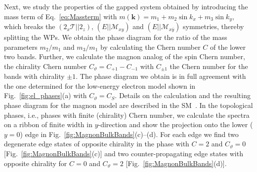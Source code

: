 \documentclass[aps,prb,twocolumn,amsmath,amssymb,floatfix]{revtex4-2}
\begin{document}
Next, we study the properties of the gapped system obtained by introducing the mass term of Eq.~\eqref{eq:Massterm} with $m(\mathbf{k})= m_1+m_2\sin k_x +m_3\sin k_y$, which breaks the $(2_x\mathcal{T}||2_z)$, $(E||\mathcal{M}_{xy})$ and $(E||\mathcal{M}_{x\overline{y}})$ symmetries, thereby splitting the WPs. We obtain the phase diagram for the ratio of the mass parameters $m_2/m_1$ and $m_3/m_1$ by calculating the Chern number $C$ of the lower two bands.  
Further, we calculate the magnon analog of the spin Chern number, the chirality Chern number $C_\vartheta = C_{+1} - C_{-1}$ with $C_{\pm1}$ the Chern number for the bands with chirality $\pm 1$. 
The phase diagram we obtain is in full agreement with the one determined for the low-energy electron model shown in Fig.~\ref{fig:el_phases}(a) with $C_\vartheta = C_{S}$. Details on the calculation and the resulting phase diagram for the magnon model are described in the SM~\cite{sm_note}. In the topological phases, i.e., phases with finite (chirality) Chern number, we calculate the spectra on a ribbon of finite width in $y$-direction and show the projection onto the lower ($y=0$) edge in \mbox{Fig.~\ref{fig:MagnonBulkBands}(c)--(d)}. 
For each edge we find two degenerate edge states of opposite chirality in the phase with $C=2$ and $C_\vartheta=0$ [Fig.~\ref{fig:MagnonBulkBands}(c)] and two counter-propagating edge states with opposite chirality for $C=0$ and $C_\vartheta=2$ [Fig.~\ref{fig:MagnonBulkBands}(d)].
\end{document}
